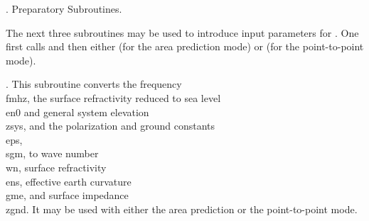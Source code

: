 .  Preparatory Subroutines.

The next three subroutines may be used to introduce input parameters for
.  One first calls  and then either %
 (for the area
prediction mode) or  (for the point-to-point mode).

\fi %

. This subroutine converts the frequency \\{fmhz}, the surface
refractivity
reduced to sea level \\{en0} and general system elevation \\{zsys}, and the
polarization and ground constants \\{eps}, \\{sgm}, to wave number \\{wn},
surface refractivity \\{ens}, effective earth curvature \\{gme}, and surface
impedance \\{zgnd}.  It may be used with either the area prediction or the
point-to-point mode.

